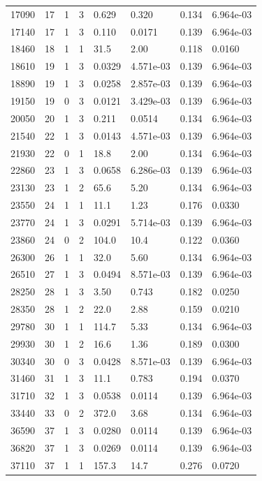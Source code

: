 \documentclass[preview]{standalone}
\begin{document}
{{\begin{tabular}{L{1.2cm}C{1.2cm} C{0.3cm}C{0.5cm} C{1.4cm}C{1.4cm} C{1.4cm}C{1.4cm}}
  17090  &    17  & 1     &  3 &  0.629  & 0.320  & 0.134 &  6.964e-03   \\ 
  17140  &    17  & 1     &  3 &  0.110  & 0.0171  & 0.139 &  6.964e-03   \\ 
  18460  &    18  & 1     &  1 &  31.5  & 2.00  & 0.118 &  0.0160   \\ 
  18610  &    19  & 1     &  3 &  0.0329  & 4.571e-03  & 0.139 &  6.964e-03   \\ 
  18890  &    19  & 1     &  3 &  0.0258  & 2.857e-03  & 0.139 &  6.964e-03   \\ 
  19150  &    19  & 0     &  3 &  0.0121  & 3.429e-03  & 0.139 &  6.964e-03   \\ 
  20050  &    20  & 1     &  3 &  0.211  & 0.0514  & 0.134 &  6.964e-03   \\ 
  21540  &    22  & 1     &  3 &  0.0143  & 4.571e-03  & 0.139 &  6.964e-03   \\ 
  21930  &    22  & 0     &  1 &  18.8  & 2.00  & 0.134 &  6.964e-03   \\ 
  22860  &    23  & 1     &  3 &  0.0658  & 6.286e-03  & 0.139 &  6.964e-03   \\ 
  23130  &    23  & 1     &  2 &  65.6  & 5.20  & 0.134 &  6.964e-03   \\ 
  23550  &    24  & 1     &  1 &  11.1  & 1.23  & 0.176 &  0.0330   \\ 
  23770  &    24  & 1     &  3 &  0.0291  & 5.714e-03  & 0.139 &  6.964e-03   \\ 
  23860  &    24  & 0     &  2 &  104.0  & 10.4  & 0.122 &  0.0360   \\ 
  26300  &    26  & 1     &  1 &  32.0  & 5.60  & 0.134 &  6.964e-03   \\ 
  26510  &    27  & 1     &  3 &  0.0494  & 8.571e-03  & 0.139 &  6.964e-03   \\ 
  28250  &    28  & 1     &  3 &  3.50  & 0.743  & 0.182 &  0.0250   \\ 
  28350  &    28  & 1     &  2 &  22.0  & 2.88  & 0.159 &  0.0210   \\ 
  29780  &    30  & 1     &  1 &  114.7  & 5.33  & 0.134 &  6.964e-03   \\ 
  29930  &    30  & 1     &  2 &  16.6  & 1.36  & 0.189 &  0.0300   \\ 
  30340  &    30  & 0     &  3 &  0.0428  & 8.571e-03  & 0.139 &  6.964e-03   \\ 
  31460  &    31  & 1     &  3 &  11.1  & 0.783  & 0.194 &  0.0370   \\ 
  31710  &    32  & 1     &  3 &  0.0538  & 0.0114  & 0.139 &  6.964e-03   \\ 
  33440  &    33  & 0     &  2 &  372.0  & 3.68  & 0.134 &  6.964e-03   \\ 
  36590  &    37  & 1     &  3 &  0.0280  & 0.0114  & 0.139 &  6.964e-03   \\ 
  36820  &    37  & 1     &  3 &  0.0269  & 0.0114  & 0.139 &  6.964e-03   \\ 
  37110  &    37  & 1     &  1 &  157.3  & 14.7  & 0.276 &  0.0720   \\ 
\hline 
\end{tabular} 

}}
\end{document}
